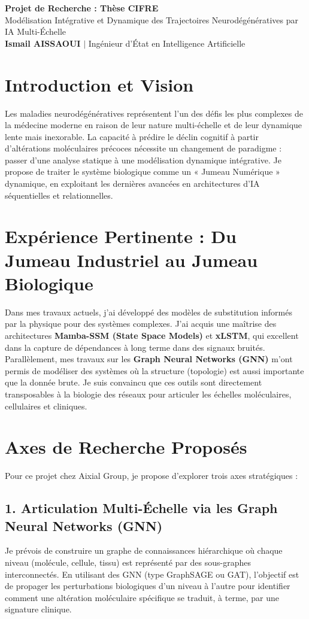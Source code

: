\documentclass[11pt,a4paper]{article}
\begin{document}
\begin{center}
    {\LARGE\bfseries\color{titleblue} Projet de Recherche : Thèse CIFRE}\\[6pt]
    {\large Modélisation Intégrative et Dynamique des Trajectoires Neurodégénératives par IA Multi-Échelle}\\[4pt]
    \textbf{Ismail AISSAOUI} $|$ Ingénieur d'État en Intelligence Artificielle
\end{center}

\bigskip

\section{Introduction et Vision}
Les maladies neurodégénératives représentent l'un des défis les plus complexes de la médecine moderne en raison de leur nature multi-échelle et de leur dynamique lente mais inexorable. La capacité à prédire le déclin cognitif à partir d'altérations moléculaires précoces nécessite un changement de paradigme : passer d'une analyse statique à une modélisation dynamique intégrative. Je propose de traiter le système biologique comme un « Jumeau Numérique » dynamique, en exploitant les dernières avancées en architectures d'IA séquentielles et relationnelles.

\section{Expérience Pertinente : Du Jumeau Industriel au Jumeau Biologique}
Dans mes travaux actuels, j'ai développé des modèles de substitution informés par la physique pour des systèmes complexes. J'ai acquis une maîtrise des architectures \textbf{Mamba-SSM (State Space Models)} et \textbf{xLSTM}, qui excellent dans la capture de dépendances à long terme dans des signaux bruités. Parallèlement, mes travaux sur les \textbf{Graph Neural Networks (GNN)} m'ont permis de modéliser des systèmes où la structure (topologie) est aussi importante que la donnée brute. Je suis convaincu que ces outils sont directement transposables à la biologie des réseaux pour articuler les échelles moléculaires, cellulaires et cliniques.

\section{Axes de Recherche Proposés}
Pour ce projet chez Aixial Group, je propose d'explorer trois axes stratégiques :

\subsection{1. Articulation Multi-Échelle via les Graph Neural Networks (GNN)}
Je prévois de construire un graphe de connaissances hiérarchique où chaque niveau (molécule, cellule, tissu) est représenté par des sous-graphes interconnectés. En utilisant des GNN (type GraphSAGE ou GAT), l'objectif est de propager les perturbations biologiques d'un niveau à l'autre pour identifier comment une altération moléculaire spécifique se traduit, à terme, par une signature clinique.
\end{document}

